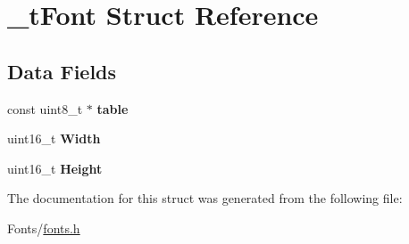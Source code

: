 \hypertarget{struct__t_font}{}\section{\+\_\+t\+Font Struct Reference}
\label{struct__t_font}
\subsection*{Data Fields}
\begin{DoxyCompactItemize}
\item 
\mbox{\label{struct__t_font_ad4b9e00a7e7d2ca54af9b8678a91a78f}} 
const uint8\+\_\+t $\ast$ {\bfseries table}
\item 
\mbox{\label{struct__t_font_a9b3fe5d83fe7eb60cd86008934f65616}} 
uint16\+\_\+t {\bfseries Width}
\item 
\mbox{\label{struct__t_font_a1a634e0d0d740b55406a6c2c194a7bfc}} 
uint16\+\_\+t {\bfseries Height}
\end{DoxyCompactItemize}


The documentation for this struct was generated from the following file\+:\begin{DoxyCompactItemize}
\item 
Fonts/\mbox{\hyperlink{fonts_8h}{fonts.\+h}}\end{DoxyCompactItemize}
